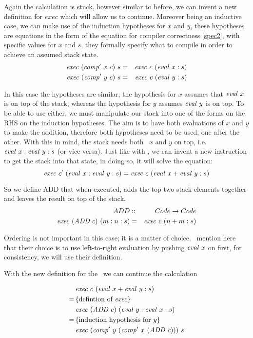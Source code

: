 \documentclass {article}
\begin{document}
Again the calculation is stuck, however similar to before, 
we can invent a new definition for $exec$ which 
will allow us to continue.
Moreover being an inductive case, 
we can make use of the induction 
hypotheses for $x$ and $y$,
these hypotheses are equations in the form
of the equation for compiler correctness \ref{spec2},
with specific values for $x$ and $s$,
they formally specify what to compile in order to achieve
an assumed stack state.
\begin{eqnarray}
\mathit{exec\ } (\mathit{comp'\ }  x\ c)\ s &=& \mathit{exec\ } c\ (\mathit{eval\ }  x:s) \label{iniduc1}\\
\mathit{exec\ } (\mathit{comp'\ }  y\ c)\ s &=& \mathit{exec\ } c\ (\mathit{eval\ }  y:s) \label{iniduc2}
\end{eqnarray}

In this case the hypotheses are similar;
the hypothesis for $x$ assumes that $\mathit{eval\ } x$
is on top of the stack,
whereas the hypothesis for $y$ assumes $\mathit{eval\ } y$
is on top.
To be able to use either, we must manipulate 
our stack into one of the forms on the RHS
on the induction hypotheses.
The aim is to have both evaluations of $x$ and $y$
to make the addition,
therefore both hypotheses need to be used,
one after the other.
With this in mind, 
the stack needs both \eval\ $x$ and $y$ on top, i.e. 
 \( \mathit{eval\ } x : \mathit{eval\ } y : s \)
(or vice versa).
Just like with \val,
we can invent a new instruction
to get the stack into that state,
in doing so, it will solve the equation:
\begin{equation*}
\mathit{exec\ }  c'\ (\mathit{eval\ } x : \mathit{eval\ } y : s) 
	= \mathit{exec\ }  c\ (\mathit{eval\ } x + \mathit{eval\ } y :s)
\end{equation*}

\newcommand{\ADDt}{\textit{ADD\ }}
\newcommand{\ADD}{\mathit{ADD\ }}

So we define ADD that
when executed, adds the top two stack elements
together and leaves the result on top of the stack.
\begin{eqnarray}
ADD &::& Code \rightarrow Code \nonumber \\
\Exec (\ADD c)\ (m:n:s) &=& \Exec c\ (n+m:s)
\end{eqnarray}

Ordering is not important in this case; it is a matter of choice.
\BH\ mention here that their choice is to use
left-to-right evaluation by pushing $\mathit{eval\ } x$ on first,
for consistency, we will use their definition.

With the new definition for the 
\exec\ we can continue the calculation 

\begin{align*}
&\Exec c\ (\evalf x + \evalf y :s) \\
=\, & \{ \mbox{defintion of \exec}\} \\
&\Exec (\ADD c)\ (\evalf  y : \evalf  x : s) \\
=\, & \{ \mbox{induction hypothesis for}\  y \} \\
&\Exec (\Compp y\ (\Compp x\ (\ADD c)))\ s
\end{align*}
\end{document}
